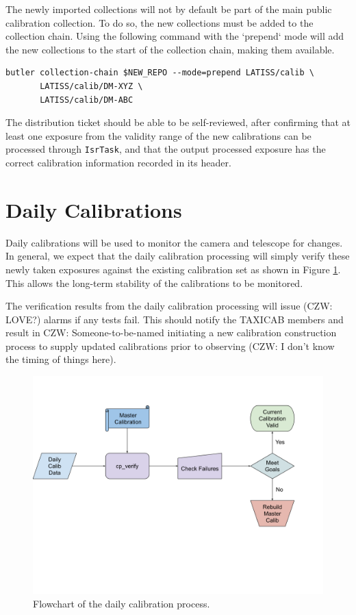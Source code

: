 \documentclass[DM,authoryear,toc]{lsstdoc}
\begin{document}
The newly imported collections will not by default be part of the main public calibration collection.  To do so, the new collections must be added to the collection chain.  Using the following command with the `prepend` mode will add the new collections to the start of the collection chain, making them available.

\begin{verbatim}
butler collection-chain $NEW_REPO --mode=prepend LATISS/calib \
       LATISS/calib/DM-XYZ \
       LATISS/calib/DM-ABC
\end{verbatim}

The distribution ticket should be able to be self-reviewed, after confirming that at least one exposure from the validity range of the new calibrations can be processed through \verb|IsrTask|, and that the output processed exposure has the correct calibration information recorded in its header.

\section{Daily Calibrations}

Daily calibrations will be used to monitor the camera and telescope for changes. In general, we expect that the daily calibration  processing will simply verify these newly taken exposures against the existing calibration set as shown in Figure \ref{fig:daily}.  This allows the long-term stability of the calibrations to be monitored.

The verification results from the daily calibration processing will issue (CZW: LOVE?) alarms if any tests fail.  This should notify the TAXICAB members and result in CZW: Someone-to-be-named initiating a new calibration construction process to supply updated calibrations prior to observing (CZW: I don't know the timing of things here).


\begin{figure}
  \includegraphics[width=\linewidth]{figures/daily_processing.png}
  \caption{Flowchart of the daily calibration process.}
  \label{fig:daily}
\end{figure}
\end{document}
